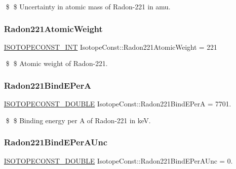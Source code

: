 \$ \$ Uncertainty in atomic mass of Radon-\/221 in amu. \mbox{\label{group___isotope_const-_radon-_rn221_ga37b5378f6ce64cf6ec059b1b8c4ba5f3}} 
\subsubsection{\texorpdfstring{Radon221\+Atomic\+Weight}{Radon221AtomicWeight}}
{\footnotesize\ttfamily \mbox{\hyperlink{group___isotope_const-_macros_ga5f18360b3e99483a35c32d789e62621c}{I\+S\+O\+T\+O\+P\+E\+C\+O\+N\+S\+T\+\_\+\+I\+NT}} Isotope\+Const\+::\+Radon221\+Atomic\+Weight = 221}

\$ \$ Atomic weight of Radon-\/221. \mbox{\label{group___isotope_const-_radon-_rn221_ga5a5116347ce255d85098885548e73ec7}} 
\subsubsection{\texorpdfstring{Radon221\+Bind\+E\+PerA}{Radon221BindEPerA}}
{\footnotesize\ttfamily \mbox{\hyperlink{group___isotope_const-_macros_ga8f45a7272ce02c0b4c65c44636ed719a}{I\+S\+O\+T\+O\+P\+E\+C\+O\+N\+S\+T\+\_\+\+D\+O\+U\+B\+LE}} Isotope\+Const\+::\+Radon221\+Bind\+E\+PerA = 7701.}

\$ \$ Binding energy per A of Radon-\/221 in keV. \mbox{\label{group___isotope_const-_radon-_rn221_gabf13152d196f8ae9cb30b6b83639b88b}} 
\subsubsection{\texorpdfstring{Radon221\+Bind\+E\+Per\+A\+Unc}{Radon221BindEPerAUnc}}
{\footnotesize\ttfamily \mbox{\hyperlink{group___isotope_const-_macros_ga8f45a7272ce02c0b4c65c44636ed719a}{I\+S\+O\+T\+O\+P\+E\+C\+O\+N\+S\+T\+\_\+\+D\+O\+U\+B\+LE}} Isotope\+Const\+::\+Radon221\+Bind\+E\+Per\+A\+Unc = 0.}

